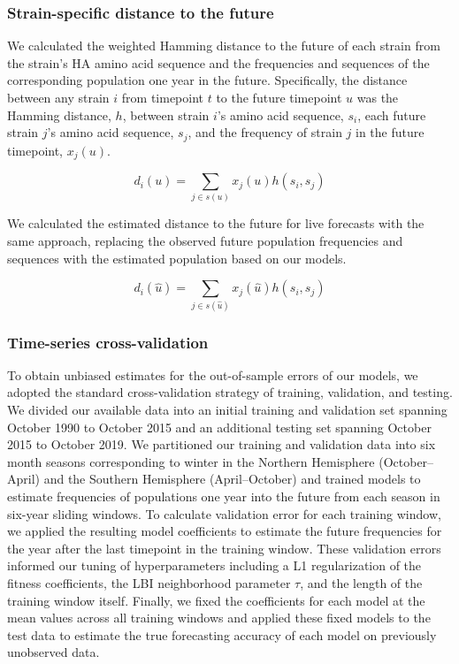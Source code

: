 \subsubsection*{Strain-specific distance to the future}

We calculated the weighted Hamming distance to the future of each strain from the strain's HA amino acid sequence and the frequencies and sequences of the corresponding population one year in the future.
Specifically, the distance between any strain $i$ from timepoint $t$ to the future timepoint $u$ was the Hamming distance, $h$, between strain $i$'s amino acid sequence, $s_{i}$, each future strain $j$'s amino acid sequence, $s_{j}$, and the frequency of strain $j$ in the future timepoint, $x_{j}(u)$.

\begin{equation}
  d_{i}(u) = \sum_{j \in s(u)}{x_{j}(u)h(s_{i}, s_{j})}
  \label{equation_observed_weighted_distance_to_future}
\end{equation}

We calculated the estimated distance to the future for live forecasts with the same approach, replacing the observed future population frequencies and sequences with the estimated population based on our models.

\begin{equation}
  d_{i}(\hat{u}) = \sum_{j \in s(\hat{u})}{x_{j}(\hat{u})h(s_{i}, s_{j})}
  \label{equation_estimated_weighted_distance_to_future}
\end{equation}

\subsubsection*{Time-series cross-validation}

To obtain unbiased estimates for the out-of-sample errors of our models, we adopted the standard cross-validation strategy of training, validation, and testing.
We divided our available data into an initial training and validation set spanning October 1990 to October 2015 and an additional testing set spanning October 2015 to October 2019.
We partitioned our training and validation data into six month seasons corresponding to winter in the Northern Hemisphere (October--April) and the Southern Hemisphere (April--October) and trained models to estimate frequencies of populations one year into the future from each season in six-year sliding windows.
To calculate validation error for each training window, we applied the resulting model coefficients to estimate the future frequencies for the year after the last timepoint in the training window.
These validation errors informed our tuning of hyperparameters including a L1 regularization of the fitness coefficients, the LBI neighborhood parameter $\tau$, and the length of the training window itself.
Finally, we fixed the coefficients for each model at the mean values across all training windows and applied these fixed models to the test data to estimate the true forecasting accuracy of each model on previously unobserved data.

